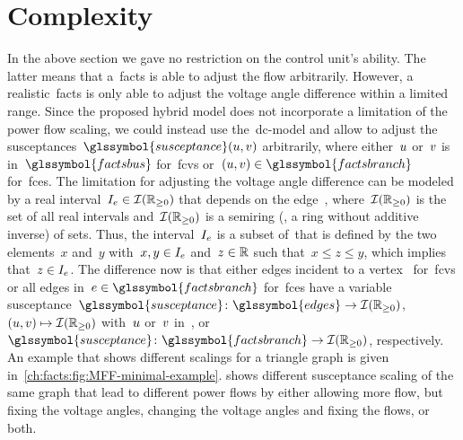 \section{Complexity} 
\label{ch:facts:sec:complexity}
%
In the above section we gave no restriction on the control unit's ability. The
latter means that a~\gls{facts} is able to adjust the flow arbitrarily. However,
a realistic~\gls{facts} is only able to adjust the voltage angle difference
within a limited range. Since the proposed hybrid model does not incorporate a
limitation of the power flow scaling, we could instead use the~\gls{dc}-model
and allow to adjust the
susceptances~$\glssymbol{susceptance}(\vertexa,\vertexb)$ arbitrarily, where
either~$u$ or~$v$ is in~$\glssymbol{factsbus}$ for~\gls{fcv}s
or~$(\vertexa,\vertexb)\in\glssymbol{factsbranch}$ for~\gls{fce}s. The
limitation for adjusting the voltage angle difference can be modeled by a real
interval~$I_{e}\in\mathcal{I}(\mathbb{R}_{\ge0})$ that depends on the
edge~\edge, where~$\mathcal{I} (\mathbb{R}_{\ge0})$ is the set of all real intervals
and~$\mathcal{I}(\mathbb{R}_{\ge0})$ is a semiring (\ie, a ring without additive inverse)
of sets. Thus, the interval~$I_{e}$ is a subset of~\reals that is
defined by the two elements~$x$ and~$y$ with~$x,y\in I_{e}$
and~$z\in\mathbb{R}$ such that~$x\leq z\leq y$, which implies
that~$z\in I_{e}$. The difference now is that either edges incident
to a vertex~ for~\gls{fcv}s or all edges
in~$\edge\in\glssymbol{factsbranch}$ for~\gls{fce}s have a variable
susceptance~$%
\glssymbol{susceptance}
\colon
\glssymbol{edges}
\to
\intervals(\posreals)$,
$ 
(u,v)
\mapsto
\mathcal{I}(\mathbb{R}_{\ge0})
$ with~$u$ or~$v$ in~,
or~$%
\glssymbol{susceptance}
\colon
\glssymbol{factsbranch}
\to
\intervals(\posreals)
% 
$, respectively. An example that shows different scalings for a triangle graph
is given in~\cref{ch:facts:fig:MFF-minimal-example}.
 shows different susceptance scaling
of the same graph that lead to different power flows by either allowing more
flow, but fixing the voltage angles, changing the voltage angles and fixing the
flows, or both.

